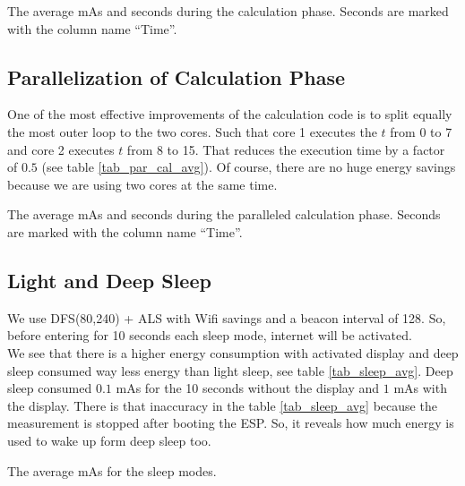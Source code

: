 \begin{table}[h]
    \centering
    \resizebox{\columnwidth}{!}{%
        
    }
    \caption{The average mAs and seconds during the calculation phase. Seconds are marked with the column name ``Time''.}
    \label{tab_cal_avg}
\end{table}



\subsection{Parallelization of Calculation Phase}
One of the most effective improvements of the calculation code is to split equally the
most outer loop to the two cores. Such that core 1 executes the $t$ from 0 to 7 and core 2
executes $t$ from 8 to 15. That reduces the execution time by a factor of $0.5$
(see table \ref{tab_par_cal_avg}). Of course, there are no huge energy savings because
we are using two cores at the same time.

\begin{table}[h]
    \centering
    \resizebox{\columnwidth}{!}{%
        
    }
    \caption{The average mAs and seconds during the paralleled calculation phase. Seconds are marked with the column name ``Time''.}
    \label{tab_par_cal_avg}
\end{table}


\subsection{Light and Deep Sleep}
We use DFS(80,240) + ALS with Wifi savings and a beacon interval of 128. So, before entering
for 10 seconds each sleep mode, internet will be activated. \\
We see that there is a higher energy consumption with activated display and deep sleep
consumed way less energy than light sleep, see table \ref{tab_sleep_avg}.
Deep sleep consumed $0.1$ mAs for the 10 seconds without the display and $1$ mAs
with the display.
There is that inaccuracy in the table \ref{tab_sleep_avg} because the measurement is stopped
after booting the ESP. So, it reveals how much energy is used to wake up form deep sleep too.


\begin{table}[h]
    \centering
    \resizebox{\columnwidth}{!}{%
        
    }
    \caption{The average mAs for the sleep modes.}
    \label{tab_sleep_avg}
\end{table}


